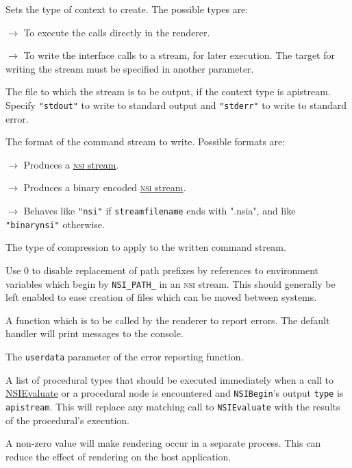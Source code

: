 \documentclass[oneside,ebook]{memoir}
\newcommand*{\acronym}[1]{\textsc{\lowercase{#1}}}
\newcommand{\paramlistitemTN}[2]{\item[#2\textcolor{lightgray}{\dotfill}#1]}
\newcommand{\paramlistitemTND}[3]{\paramlistitemTN{#1 {\rmfamily({\ttfamily#3})}}{#2}}
\newcommand{\paramvalueitem}[1]{\item[#1]$\rightarrow$}
\begin{document}
\begin{paramlist}
\paramlistitemTND{string}{type}{render}
Sets the type of context to create. The possible types are:
\begin{paramvaluelist}
\paramvalueitem{render} To execute the calls directly in the renderer.
\paramvalueitem{apistream} To write the interface calls to a stream, for later execution. The target for writing the stream must be specified in another parameter.
\end{paramvaluelist}

\paramlistitemTN{string}{streamfilename}
The file to which the stream is to be output, if the context type is apistream. Specify \lstinline|"stdout"| to write to standard output and \lstinline|"stderr"| to write to standard error.

\paramlistitemTND{string}{streamformat}{nsi}
The format of the command stream to write. Possible formats are:
\begin{paramvaluelist}
\paramvalueitem{nsi}
Produces a \hyperref[section:nsistream]{\acronym{NSI} stream}.
\paramvalueitem{binarynsi}
Produces a binary encoded \hyperref[section:nsistream]{\acronym{NSI} stream}.
\paramvalueitem{autonsi}
Behaves like \lstinline|"nsi"| if \lstinline|streamfilename| ends with ".nsia", and like \lstinline|"binarynsi"| otherwise.

\end{paramvaluelist}
\paramlistitemTN{string}{streamcompression}
The type of compression to apply to the written command stream.
\paramlistitemTND{int}{streampathreplacement}{1}
Use 0 to disable replacement of path prefixes by references to environment variables which begin by \lstinline|NSI_PATH_| in an \acronym{NSI} stream. This should generally be left enabled to ease creation of files which can be moved between systems.
\paramlistitemTN{pointer}{errorhandler}
A function which is to be called by the renderer to report errors. The default handler will print messages to the console.
\paramlistitemTN{pointer}{errorhandlerdata}
The \lstinline|userdata| parameter of the error reporting function.
\paramlistitemTN{string}{executeprocedurals}
A list of procedural types that should be executed immediately when a call to \hyperref[CAPI:nsievaluate]{NSIEvaluate} or a procedural node is encountered and \lstinline|NSIBegin|'s output \lstinline|type| is \lstinline|apistream|.
This will replace any matching call to \lstinline|NSIEvaluate| with the results of the procedural's execution.
\paramlistitemTND{int}{separateprocess}{0}
A non-zero value will make rendering occur in a separate process.
This can reduce the effect of rendering on the host application.
\end{paramlist}
\end{document}
